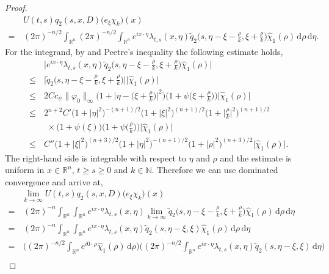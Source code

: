 \documentclass[a4paper, 12pt]{report}
\theoremstyle{remark}
\theoremstyle{definition}
\begin{document}
\begin{proof}
$$
\begin{aligned}
& \, U(t, s)q_2(s, x, D)\big(e_\xi\chi_k\big)(x)\\
= & \, (2\pi)^{-n/2}\int_{\mathbb{R}^n}(2\pi)^{-n/2}\int_{\mathbb{R}^n}e^{ix\cdot\eta}\lambda_{t, s}(x, \eta)\tilde{q}_2\Big(s, \eta - \xi - \frac{\rho}{k}, \xi + \frac{\rho}{k}\Big)\hat{\chi}_1(\rho)\,\mathrm{d}\rho\,\mathrm{d}\eta.
\end{aligned}
$$
For the integrand, by \cite[Lemma 6.2.B]{RZ} and Peetre's inequality the following estimate holds,
$$
\begin{aligned}
& \, \bigg|e^{ix\cdot\eta}\lambda_{t, s}(x, \eta)\tilde{q}_2\Big(s, \eta - \xi - \frac{\rho}{k}, \xi + \frac{\rho}{k}\Big)\hat{\chi}_1(\rho)\bigg|\\
\le & \, \bigg|\tilde{q}_2\Big(s, \eta - \xi - \frac{\rho}{k}, \xi + \frac{\rho}{k}\Big)\bigg|\big|\hat{\chi}_1(\rho)\big|\\
\le & \, 2Cc_\psi\|\varphi_0\|_\infty\bigg(1 + \Big|\eta - \Big(\xi + \frac{\rho}{k}\Big)\Big|^2\bigg)\bigg(1 + \psi\Big(\xi + \frac{\rho}{k}\Big)\bigg)\big|\hat{\chi}_1(\rho)\big|\\
\le & \, 2^{n + 2}C'\big(1 + |\eta|^2\big)^{-(n + 1)/2}\big(1 + |\xi|^2\big)^{(n + 1)/2}\bigg(1 + \Big|\frac{\rho}{k}\Big|^2\bigg)^{(n + 1)/2}\\
& \,\,\, \times \big(1 + \psi(\xi)\big)\bigg(1 + \psi\Big(\frac{\rho}{k}\Big)\bigg)\big|\hat{\chi}_1(\rho)\big|\\
\le & \, C''\big(1 + |\xi|^2\big)^{(n + 3)/2}\big(1 + |\eta|^2\big)^{-(n + 1)/2}\big(1 + |\rho|^2\big)^{(n + 3)/2}\big|\hat{\chi}_1(\rho)\big|.
\end{aligned}
$$
The right-hand side is integrable with respect to $\eta$ and $\rho$ and the estimate is uniform in $x \in \mathbb{R}^n$, $t \ge s \ge 0$ and $k \in \mathbb{N}$.  Therefore we can use dominated convergence and arrive at,
$$
\begin{aligned}
& \lim_{k \to \infty}U(t, s)q_2(s, x, D)\big(e_\xi\chi_k\big)(x)\\
= & \, (2\pi)^{-n}\int_{\mathbb{R}^n}\int_{\mathbb{R}^n}e^{ix\cdot\eta}\lambda_{t, s}(x, \eta)\lim_{k \to \infty}\tilde{q}_2\Big(s, \eta - \xi - \frac{\rho}{k}, \xi + \frac{\rho}{k}\Big)\hat{\chi}_1(\rho)\,\mathrm{d}\rho\,\mathrm{d}\eta\\
= & \, (2\pi)^{-n}\int_{\mathbb{R}^n}\int_{\mathbb{R}^n}e^{ix\cdot\eta}\lambda_{t, s}(x, \eta)\tilde{q}_2(s, \eta - \xi, \xi)\hat{\chi}_1(\rho)\,\mathrm{d}\rho\,\mathrm{d}\eta\\
= & \, \bigg((2\pi)^{-n/2}\int_{\mathbb{R}^n}e^{i0\cdot\rho}\hat{\chi}_1(\rho)\,\mathrm{d}\rho\bigg)\bigg((2\pi)^{-n/2}\int_{\mathbb{R}^n}e^{ix\cdot\eta}\lambda_{t, s}(x, \eta)\tilde{q}_2(s, \eta - \xi, \xi)\,\mathrm{d}\eta\bigg)\\

\end{aligned}$$
\end{proof}
\end{document}
